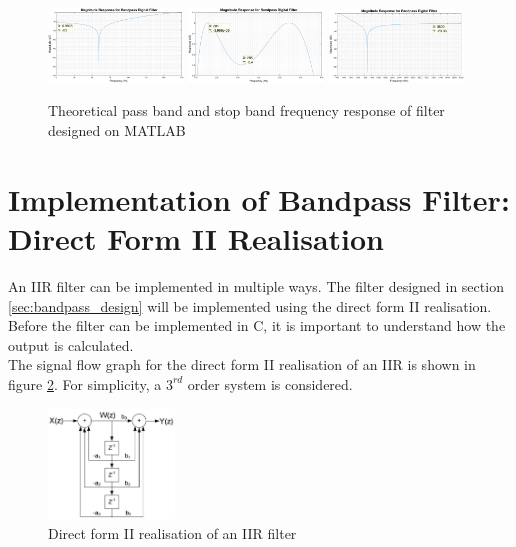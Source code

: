 \documentclass{article}
\begin{document}
\begin{figure}[H]
    \centering
    \includegraphics[width = 0.32\textwidth]{mag_response_digital_filter_stopband_left}
    \includegraphics[width = 0.32\textwidth]{mag_response_digital_filter_passband_zoom}
    \includegraphics[width = 0.32\textwidth]{mag_response_digital_filter_stopband_right}
    \caption{Theoretical pass band and stop band frequency response of filter designed on MATLAB}
    \label{fig:passband_zoom}
\end{figure}

\newpage
\section{Implementation of Bandpass Filter: Direct Form II Realisation}\label{sec:direct_form_II}
An IIR filter can be implemented in multiple ways. The filter designed in section \ref{sec:bandpass_design} will be implemented using the direct form II realisation. Before the filter can be implemented in C, it is important to understand how the output is calculated.\\

The signal flow graph for the direct form II realisation of an IIR is shown in figure \ref{fig:iir_direct_form_II}. For simplicity, a $3^{rd}$ order system is considered.


\begin{figure}[H]
    \centering
    \includegraphics[width = 0.3\textwidth]{iir_direct_form_II}
    \caption{Direct form II realisation of an IIR filter}
    \label{fig:iir_direct_form_II}
\end{figure}
\end{document}
